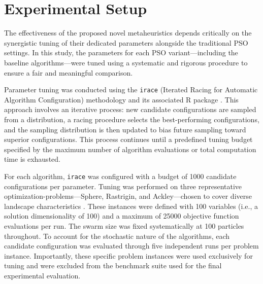 {%








\section{Experimental Setup}


The effectiveness of the proposed novel \glspl{metaheuristic} depends critically on the synergistic tuning of their dedicated parameters alongside the traditional PSO settings. In this study, the parameters for each PSO variant---including the baseline algorithms---were tuned using a systematic and rigorous procedure to ensure a fair and meaningful comparison.

Parameter tuning was conducted using the \texttt{irace} (Iterated Racing for Automatic Algorithm Configuration) methodology and its associated R package \citep{lopezibanez2016irace}. This approach involves an iterative process: new candidate configurations are sampled from a distribution, a racing procedure selects the best-performing configurations, and the sampling distribution is then updated to bias future sampling toward superior configurations. This process continues until a predefined tuning budget specified by the maximum number of algorithm evaluations or total computation time is exhausted.

For each algorithm, \texttt{irace} was configured with a budget of 1000 candidate configurations per parameter. Tuning was performed on three representative \glspl{optimization-problem}---Sphere, Rastrigin, and Ackley---chosen to cover diverse landscape characteristics \citep{los2018misfit}. These instances were defined with 100 variables (i.e., a solution dimensionality of 100) and a maximum of 25000 objective function evaluations per run. The swarm size was fixed systematically at 100 particles throughout. To account for the stochastic nature of the algorithms, each candidate configuration was evaluated through five independent runs per problem instance. Importantly, these specific problem instances were used exclusively for tuning and were excluded from the benchmark suite used for the final experimental evaluation.

}
